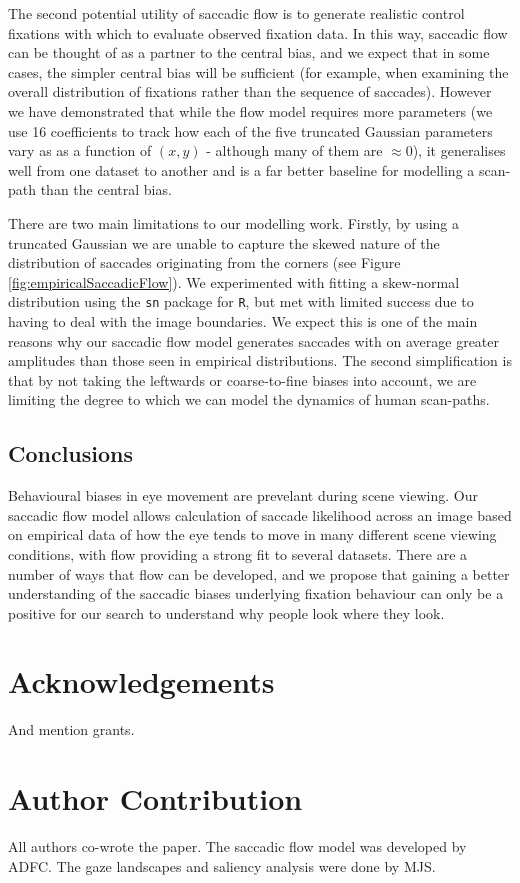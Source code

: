 \documentclass[a4paper, twocolumn, oneside, 10pt]{article}
\begin{document}
The second potential utility of saccadic flow is to generate realistic control fixations with which to evaluate observed fixation data. In this way, saccadic flow can be thought of as a partner to the \cite{clarke-tatler2014} central bias, and we expect that in some cases, the simpler central bias will be sufficient (for example, when examining the overall distribution of fixations rather than the sequence of saccades). However we have demonstrated that while the flow model requires more parameters (we use 16 coefficients to track how each of the five truncated Gaussian parameters vary as as a function of $(x,y)$ - although many of them are $\approx 0$), it generalises well from one dataset to another and is a far better baseline for modelling a scan-path than the central bias.

There are two main limitations to our modelling work. Firstly, by using a truncated Gaussian we are unable to capture the skewed nature of the distribution of saccades originating from the corners (see Figure \ref{fig:empiricalSaccadicFlow}). We experimented with fitting a skew-normal distribution using the \texttt{sn} package for \texttt{R}, but met with limited success due to having to deal with the image boundaries. We expect this is one of the main reasons why our saccadic flow model generates saccades with on average greater amplitudes than those seen in empirical distributions. The second simplification is that by not taking the leftwards or coarse-to-fine biases into account, we are limiting the degree to which we can model the dynamics of human scan-paths.

\subsection{Conclusions}
Behavioural biases in eye movement are prevelant during scene viewing. Our saccadic flow model allows calculation of saccade likelihood across an image based on empirical data of how the eye tends to move in many different scene viewing conditions, with flow providing a strong fit to several datasets. There are a number of ways that flow can be developed, and we propose that gaining a better understanding of the saccadic biases underlying fixation behaviour can only be a positive for our search to understand why people look where they look.


\section*{Acknowledgements}

And mention grants. 

\section*{Author Contribution}

All authors co-wrote the paper. The saccadic flow model was developed by ADFC. The gaze landscapes and saliency analysis were done by MJS.

\appendix



\small

\end{document}
